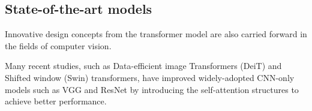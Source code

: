 \subsection{State-of-the-art models}

Innovative design concepts from the transformer model are also carried forward in the fields of computer vision.

Many recent studies, such as Data-efficient image Transformers (DeiT) and Shifted window (Swin) transformers, have improved widely-adopted CNN-only models such as VGG and ResNet by introducing the self-attention structures to achieve better performance.

\citet{dai2021coatnet}

\citet{guo2021cmt}
